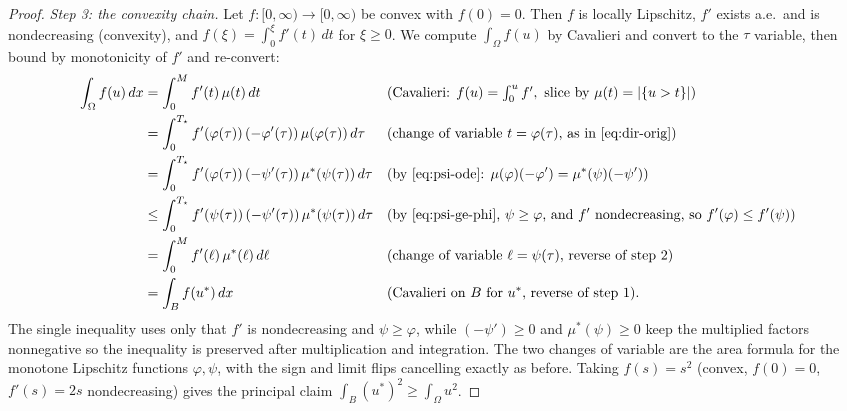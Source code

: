 \documentclass[11pt]{amsart}
\theoremstyle{definition}
\newcommand{\Om}{\Omega}
\newcommand{\abs}[1]{\left|#1\right|}
\newcommand{\dx}{\,dx}
\newcommand{\dt}{\,dt}
\begin{document}
\begin{proof}
\emph{Step 3: the convexity chain.} Let $f:[0,\infty)\to[0,\infty)$ be
convex with $f(0)=0$. Then $f$ is locally Lipschitz, $f'$ exists a.e.\ and
is nondecreasing (convexity), and $f(\xi)=\int_0^\xi f'(t)\,dt$ for
$\xi\ge0$. We compute $\int_\Om f(u)$ by Cavalieri and convert to the $\tau$
variable, then bound by monotonicity of $f'$ and re-convert:
\begin{align*}
  \int_\Om f(u)\dx
  &=\int_0^M f'(t)\,\mu(t)\dt
   &&\text{(Cavalieri: }f(u)=\textstyle\int_0^u f', \text{ slice by }
     \mu(t)=\abs{\{u>t\}})\\
  &=\int_0^{T_\star}f'(\varphi(\tau))\,(-\varphi'(\tau))\,\mu(\varphi(\tau))
     \,d\tau
   &&\text{(change of variable }t=\varphi(\tau)\text{, as in
     \eqref{eq:dir-orig})}\\
  &=\int_0^{T_\star}f'(\varphi(\tau))\,(-\psi'(\tau))\,\mu^*(\psi(\tau))
     \,d\tau
   &&\text{(by \eqref{eq:psi-ode}: }\mu(\varphi)(-\varphi')
     =\mu^*(\psi)(-\psi'))\\
  &\le\int_0^{T_\star}f'(\psi(\tau))\,(-\psi'(\tau))\,\mu^*(\psi(\tau))
     \,d\tau
   &&\text{(by \eqref{eq:psi-ge-phi}, }\psi\ge\varphi\text{, and }f'
     \text{ nondecreasing, so }f'(\varphi)\le f'(\psi))\\
  &=\int_0^M f'(\ell)\,\mu^*(\ell)\,d\ell
   &&\text{(change of variable }\ell=\psi(\tau)\text{, reverse of step 2)}\\
  &=\int_B f(u^*)\dx
   &&\text{(Cavalieri on }B\text{ for }u^*\text{, reverse of step 1).}
\end{align*}
The single inequality uses only that $f'$ is nondecreasing and $\psi\ge
\varphi$, while $(-\psi')\ge0$ and $\mu^*(\psi)\ge0$ keep the multiplied
factors nonnegative so the inequality is preserved after multiplication and
integration. The two changes of variable are the area formula for the
monotone Lipschitz functions $\varphi,\psi$, with the sign and limit flips
cancelling exactly as before. Taking $f(s)=s^2$ (convex, $f(0)=0$,
$f'(s)=2s$ nondecreasing) gives the principal claim $\int_B(u^*)^2\ge
\int_\Om u^2$.


\end{proof}
\end{document}
